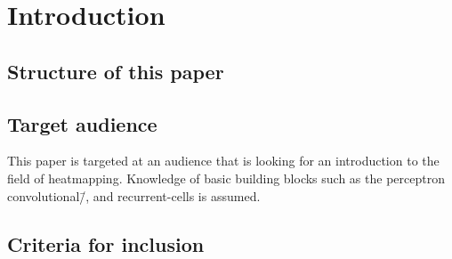 \section{Introduction}
\blindtext[3]

\subsection{Structure of this paper}
\blindtext[3]

\subsection{Target audience}
This paper is targeted at an audience that is looking for an introduction to 
the field of heatmapping. Knowledge of basic building blocks such as the 
perceptron convolutional\=/, and \mbox{recurrent-cells} is assumed.

\subsection{Criteria for inclusion}
\blindtext[3]